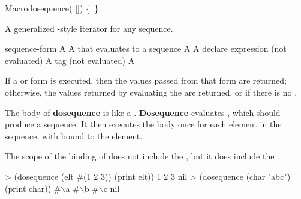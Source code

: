 \documentclass[10pt,twoside,english,pdftex]{article}
\begin{document}
\begin{functiondoc}{Macro}{dosequence}{( 
  []) \superstar{} 
  \mbox{\{ \vbar{} \}\superstar}
  \returns{} \superstar}
%
  
\fnsyntax

\fnpurpose A generalized -style iterator for any sequence.

\fnpackage {}

\fnmodule {}

\fnargs
\begin{args}{sequence-form}
\arg[var] A 
 A  that evaluates to a sequence
 A 
\arg[declarations] A declare expression (not evaluated)
\arg[tag] A  tag (not evaluated)
\arg[form] A 
\end{args}

\fnreturns If a  or  form is executed, then
the values passed from that form are returned; otherwise, the values
returned by evaluating the  are returned, or \nil{} if
there is no .

\fndescription The body of \textbf{dosequence} is like a .
\textbf{Dosequence} evaluates , which should produce a
sequence. It then executes the body once for each element in the sequence,
with  bound to the element.

The scope of the binding of  does not include the
, but it does include the .

\fnexamples
%
\W\supp
\begin{example}
> (dosequence (elt #(1 2 3)) (print elt))
1 
2 
3 
nil\goodpagebreak
> (dosequence (char "abc") (print char))
#\(\backslash\)a 
#\(\backslash\)b 
#\(\backslash\)c
nil
\end{example}

\end{functiondoc}

\end{document}
